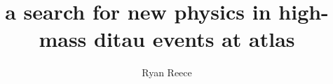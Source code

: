 
\title{a search for new physics in high-mass ditau events at atlas}
    
\author{Ryan Reece}

\newcommand{\adviser}{H.H. Williams, Professor, Physics}
\newcommand{\advisershort}{H.H. Williams}

\newcommand{\myinstitution}{The Univeristy of Pennsylvania}

\newcommand{\chairperson}{A.T. Charlie Johnson, Professor, Physics}

\newcommand{\committeeOne}{Randall Kamien, Professor, Physics}
\newcommand{\committeeTwo}{I. Joseph Kroll, Professor, Physics}
\newcommand{\committeeThree}{Elliot Lipeles, Assistant Professor, Physics}
\newcommand{\committeeFour}{Burt Ovrut, Professor, Physics}



